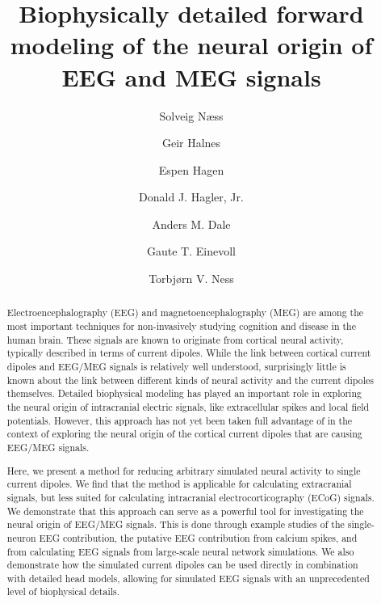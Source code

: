 \documentclass[preprint,10pt,authoryear]{elsarticle}
\newcommand{\newtxt}[1]{{\color{Red}#1}}
\begin{document}
\begin{frontmatter}
	
	\title{\newtxt{Biophysically detailed forward} modeling of the neural origin of EEG and MEG signals
	}
	
	\author{Solveig N\ae{}ss}
	\author{Geir Halnes}
	\author{Espen Hagen }
	\author{Donald J. Hagler, Jr.}
	\author{Anders M. Dale}
	\author{Gaute T. Einevoll}
	\author{Torbj\o{}rn V. Ness}
	
	\address[label1]{Department of Informatics, University of Oslo, 0316 Oslo, Norway}
	\address[label2]{Faculty of Science and Technology, Norwegian University of Life Sciences, 1432 Ås, Norway}
	\address[label3]{Department of Physics, University of Oslo, 0316 Oslo, Norway}
	\address[label4]{Department of Radiology, University of California, La Jolla, CA 92093, USA}
	\address[label5]{Department of Neurosciences, University of California, La Jolla, CA 92093, USA}
	\begin{abstract}
	Electroencephalography (EEG) and magnetoencephalography (MEG) are among the most important techniques for non-invasively studying cognition and disease in the human brain. 
These signals are known to originate from cortical neural activity, typically described in terms of current dipoles.
While the link between cortical current dipoles and EEG/MEG signals is relatively well understood, surprisingly little is known about the link between different kinds of neural activity and the current dipoles themselves.
Detailed biophysical modeling has played an important role in exploring the neural origin of intracranial electric signals, like extracellular spikes and local field potentials. However, this approach has not yet been taken full advantage of in the context of exploring the neural origin of the cortical current dipoles that are causing EEG/MEG signals.

Here, we present a method for reducing arbitrary simulated neural activity to single current dipoles.
We find that the method is applicable for calculating extracranial signals, but less suited for calculating intracranial electrocorticography (ECoG) signals. We demonstrate that this approach can serve as a powerful tool for investigating the neural origin of EEG/MEG signals. This is done through example studies of the single-neuron EEG contribution, the putative EEG contribution from calcium spikes, and from calculating EEG signals from large-scale neural network simulations.
We also demonstrate how the simulated current dipoles can be used directly in combination with detailed head models, allowing for simulated EEG signals with an unprecedented level of biophysical details. 


\end{abstract}
\end{frontmatter}
\end{document}
